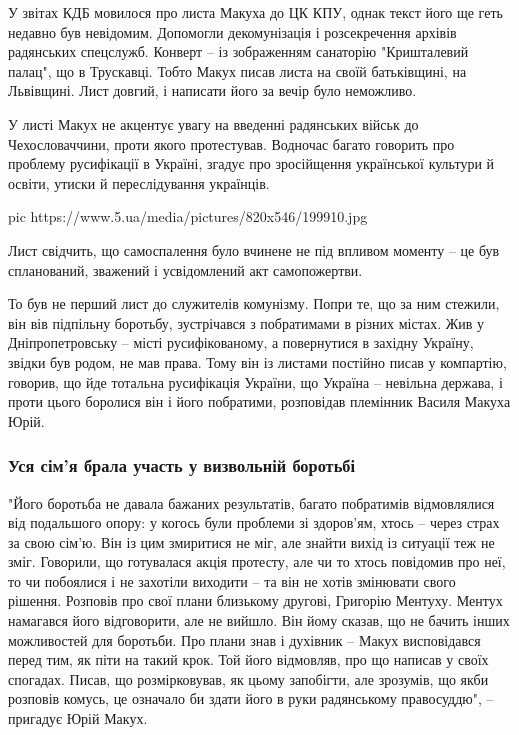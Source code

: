 У звітах КДБ мовилося про листа Макуха до ЦК КПУ, однак текст його ще
геть недавно був невідомим. Допомогли декомунізація і розсекречення
архівів радянських спецслужб. Конверт – із зображенням санаторію
"Кришталевий палац", що в Трускавці. Тобто Макух писав листа на своїй
батьківщині, на Львівщині. Лист довгий, і написати його за вечір було
неможливо.

У листі Макух не акцентує увагу на введенні радянських військ до
Чехословаччини, проти якого протестував. Водночас багато говорить про
проблему русифікації в Україні, згадує про зросійщення української
культури й освіти, утиски й переслідування українців.

\ifcmt
pic https://www.5.ua/media/pictures/820x546/199910.jpg
\fi


Лист свідчить, що самоспалення було вчинене не під впливом моменту – це був
спланований, зважений і усвідомлений акт самопожертви.

То був не перший лист до служителів комунізму. Попри те, що за ним стежили, він
вів підпільну боротьбу, зустрічався з побратимами в різних містах. Жив у
Дніпропетровську – місті русифікованому, а повернутися в західну Україну,
звідки був родом, не мав права. Тому він із листами постійно писав у компартію,
говорив, що йде тотальна русифікація України, що Україна – невільна держава, і
проти цього боролися він і його побратими, розповідав племінник Василя Макуха
Юрій.

\subsubsection{Уся сім'я брала участь у визвольній боротьбі}

"Його боротьба не давала бажаних результатів, багато побратимів
відмовлялися від подальшого опору: у когось були проблеми зі здоров'ям,
хтось – через страх за свою сім'ю. Він із цим змиритися не міг, але знайти
вихід із ситуації теж не зміг. Говорили, що готувалася акція протесту, але
чи то хтось повідомив про неї, то чи побоялися і не захотіли виходити – та
він не хотів змінювати свого рішення. Розповів про свої плани близькому
другові, Григорію Ментуху. Ментух намагався його відговорити, але не
вийшло. Він йому сказав, що не бачить інших можливостей для боротьби. Про
плани знав і духівник – Макух висповідався перед тим, як піти на такий
крок. Той його відмовляв, про що написав у своїх спогадах. Писав, що
розмірковував, як цьому запобігти, але зрозумів, що якби розповів комусь,
це означало би здати його в руки радянському правосуддю", – пригадує Юрій
Макух.

